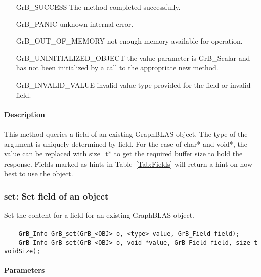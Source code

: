 \begin{itemize}[leftmargin=2.1in]
\item[{\sf GrB\_SUCCESS}]  The method completed successfully.
\item[{\sf GrB\_PANIC}]             unknown internal error.
\item[{\sf GrB\_OUT\_OF\_MEMORY}]          not enough memory available for operation.
\item[{\sf GrB\_UNINITIALIZED\_OBJECT}]          the {\sf value} parameter is {\sf GrB\_Scalar} and has not been
                                    initialized by a call to the appropriate {\sf new} method.
\item[{\sf GrB\_INVALID\_VALUE}]    invalid value type provided for the field or invalid field.
\end{itemize}

\paragraph{Description}

This method queries a field of an existing GraphBLAS object.
The type of the argument is uniquely determined by {\sf field}.
For the case of {\sf char*} and {\sf void*}, the value can be replaced with {\sf size\_t*}
to get the required buffer size to hold the response.
Fields marked as hints in Table~\ref{Tab:Fields} will return a hint on how best to use the
object.

\subsubsection{{\sf set}: Set field of an object}

Set the content for a field for an existing GraphBLAS object.

\paragraph{\syntax}

\begin{verbatim}
    GrB_Info GrB_set(GrB_<OBJ> o, <type> value, GrB_Field field);
    GrB_Info GrB_set(GrB_<OBJ> o, void *value, GrB_Field field, size_t voidSize);
\end{verbatim}

\paragraph{Parameters}

